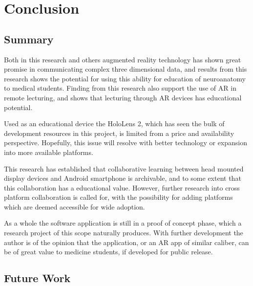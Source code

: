 \chapter{Conclusion}

\section{Summary}

Both in this research and others augmented reality technology has shown great promise in communicating complex three dimensional data, and results from this research shows the potential for using this ability for education of neuroanatomy to medical students. Finding from this research also support the use of AR in remote lecturing, and shows that lecturing through AR devices has educational potential.

Used as an educational device the HoloLens 2, which has seen the bulk of development resources in this project, is limited from a price and availability perspective. Hopefully, this issue will resolve with better technology or expansion into more available platforms.

This research has established that collaborative learning between head mounted display devices and Android smartphone is archivable, and to some extent that this collaboration has a educational value. However, further research into cross platform collaboration is called for, with the possibility for adding platforms which are deemed accessible for wide adoption.

As a whole the software application is still in a proof of concept phase, which a research project of this scope naturally produces. With further development the author is of the opinion that the application, or an AR app of similar caliber, can be of great value to medicine students, if developed for public release.




\section{Future Work}\label{chap:futurework}


